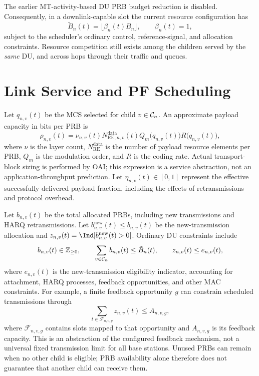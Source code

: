 \begin{EnChapter}
The earlier MT-activity-based DU PRB budget reduction is disabled. Consequently,
in a downlink-capable slot the current resource configuration has
\begin{equation}
  \tilde B_n(t)=\lfloor\beta_n(t)B_n\rfloor,\qquad
  \beta_n(t)=1,
  \label{eq:beta}
\end{equation}
subject to the scheduler's ordinary control, reference-signal, and allocation
constraints. Resource competition still exists among the children served by the
\emph{same} DU, and across hops through their traffic and queues.

\section{Link Service and PF Scheduling}
\label{subsec:rate}
\label{subsec:coupling}

Let $q_{n,v}(t)$ be the MCS selected for child $v\in\mathcal{C}_n$.
An approximate payload capacity in bits per PRB is
\begin{equation}
  \rho_{n,v}(t)=\nu_{n,v}(t)N_{\mathrm{RE},n,v}^{\mathrm{data}}(t)
               Q_m\bigl(q_{n,v}(t)\bigr)R\bigl(q_{n,v}(t)\bigr),
  \label{eq:rho}
\end{equation}
where $\nu$ is the layer count, $N_{\mathrm{RE}}^{\mathrm{data}}$ is the number of
payload resource elements per PRB, $Q_m$ is the modulation order, and $R$ is the
coding rate. Actual transport-block sizing is performed by OAI; this expression
is a service abstraction, not an application-throughput prediction. Let
$\eta_{n,v}(t)\in[0,1]$ represent the effective successfully delivered payload
fraction, including the effects of retransmissions and protocol overhead.

Let $b_{n,v}(t)$ be the total allocated PRBs, including new transmissions and
HARQ retransmissions. Let $b_{n,v}^{\mathrm{new}}(t)\le b_{n,v}(t)$ be the
new-transmission allocation and $z_{n,v}(t)=\Ind[b_{n,v}^{\mathrm{new}}(t)>0]$.
Ordinary DU constraints include
\begin{equation}
  b_{n,v}(t)\in\mathbb{Z}_{\ge0},\qquad
  \sum_{v\in\mathcal{C}_n}b_{n,v}(t)\le\tilde B_n(t),\qquad
  z_{n,v}(t)\le e_{n,v}(t),
  \label{eq:du-budget}
\end{equation}
where $e_{n,v}(t)$ is the new-transmission eligibility indicator, accounting for
attachment, HARQ processes, feedback opportunities, and other MAC constraints.
For example, a finite feedback opportunity $g$ can constrain scheduled
transmissions through
\begin{equation}
  \sum_{t\in\mathcal{F}_{n,v,g}}z_{n,v}(t)\le A_{n,v,g},
  \label{eq:feedback}
\end{equation}
where $\mathcal{F}_{n,v,g}$ contains slots mapped to that opportunity and
$A_{n,v,g}$ is its feedback capacity. This is an abstraction of the configured
feedback mechanism, not a universal fixed transmission limit for all base stations.
Unused PRBs can remain when no other child is eligible; PRB availability alone
therefore does not guarantee that another child can receive them.


\end{EnChapter}
